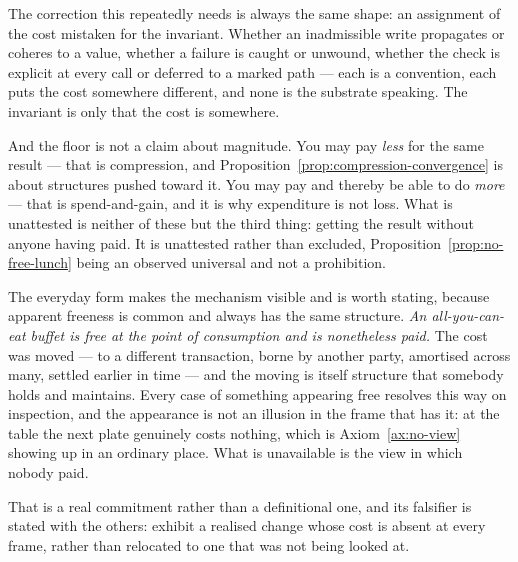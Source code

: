\documentclass[11pt,a4paper]{article}
\theoremstyle{remark}\newtheorem{remark}[definition]{Remark}
\begin{document}
The correction this repeatedly needs is always the same shape: an assignment of the cost mistaken for the invariant. Whether an inadmissible write
propagates or coheres to a value, whether a failure is caught or unwound, whether the check is explicit
at every call or deferred to a marked path --- each is a convention, each puts the cost somewhere
different, and none is the substrate speaking. The invariant is only that the cost is somewhere.

And the floor is not a claim about magnitude. You may pay \emph{less} for the same result --- that is
compression, and Proposition~\ref{prop:compression-convergence} is about structures pushed toward it.
You may pay and thereby be able to do \emph{more} --- that is spend-and-gain, and it is why expenditure
is not loss. What is unattested is neither of these but the third thing: getting the result without anyone having
paid. It is unattested rather than excluded, Proposition~\ref{prop:no-free-lunch} being an observed
universal and not a prohibition.

The everyday form makes the mechanism visible and is worth stating, because apparent freeness is
common and always has the same structure. \emph{An all-you-can-eat buffet is free at the point of
consumption and is nonetheless paid.} The cost was moved --- to a different transaction, borne by
another party, amortised across many, settled earlier in time --- and the moving is itself structure
that somebody holds and maintains. Every case of something appearing free resolves this way on
inspection, and the appearance is not an illusion in the frame that has it: at the table the next plate
genuinely costs nothing, which is Axiom~\ref{ax:no-view} showing up in an ordinary place. What is
unavailable is the view in which nobody paid.

That is a real commitment rather than a definitional one, and its falsifier is stated with the others:
exhibit a realised change whose cost is absent at every frame, rather than relocated to one that was
not being looked at.
\end{document}
